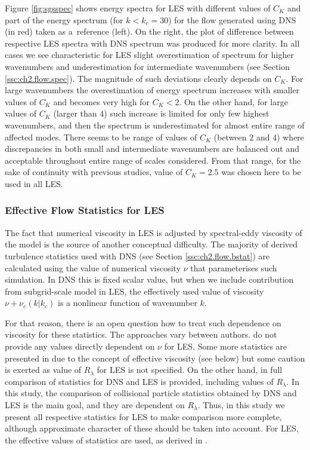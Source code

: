 \documentclass{pracamgren}
\begin{document}
Figure \ref{fig:sgsspec} shows energy spectra for LES with different values of $C_K$ and part of the energy spectrum (for $k < k_c = 30$) for the flow generated using DNS (in red) taken as a~reference (left).
On the right, the plot of difference between respective LES spectra with DNS spectrum was produced for more clarity.
In all cases we see characteristic for LES slight overestimation of spectrum for higher wavenumbers and underestimation for intermediate wavenumbers (see Section \ref{ssc:ch2.flow.spec}).
The magnitude of such deviations clearly depends on $C_K$.
For large wavenumbers the overestimation of energy spectrum increases with smaller values of $C_K$ and becomes very high for $C_K < 2$.
On the other hand, for large values of $C_K$ (larger than $4$) such increase is limited for only few highest wavenumbers, and then the spectrum is underestimated for almost entire range of affected modes.
There seems to be range of values of $C_K$ (between $2$ and $4$) where discrepancies in both small and intermediate wavenumbers are balanced out and acceptable throughout entire range of scales considered.
From that range, for the sake of continuity with previous studies, value of $C_K=2.5$ was chosen here to be used in all LES.


\subsubsection{Effective Flow Statistics for LES}

The fact that numerical viscosity in LES is adjusted by spectral-eddy viscosity of the model is the source of another conceptual difficulty.
The majority of derived turbulence statistics used with DNS (see Section \ref{ssc:ch2.flow.bstat}) are calculated using the value of numerical viscosity $\nu$ that parameterises such simulation.
In DNS this is fixed scalar value, but when we include contribution from subgrid-scale model in LES, the effectively used value of viscosity $\nu + \nu_{e}(k|k_c)$ is a nonlinear function of wavenumber $k$.

For that reason, there is an open question how to treat such dependence on viscosity for these statistics.
The approaches vary between authors.
\textcite[Table 1]{Yang2008} do not provide any values directly dependent on $\nu$ for LES.
Some more statistics are presented in \textcite[Table 1]{Jin2010} due to the concept of effective viscosity (see below) but some caution is exerted as value of $R_{\lambda}$ for LES is not specified.
On the other hand, in \textcite[Table 1]{Rosa2017} full comparison of statistics for DNS and LES is provided, including values of $R_{\lambda}$.
In this study, the comparison of collisional particle statistics obtained by DNS and LES is the main goal, and they are dependent on $R_{\lambda}$.
Thus, in this study we present all respective statistics for LES to make comparison more complete, although approximate character of these should be taken into account.
For LES, the effective values of statistics are used, as derived in \textcite{Jin2010}.
\end{document}
